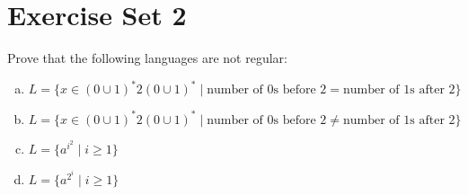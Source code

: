 \section{Exercise Set 2}\label{sec:exercise-set-2}
\begin{exercise}{1}
    Prove that the following languages are not regular:
    \begin{enumerate}[(a)]
        \item \(L=\{x\in{(0\cup1)}^*2{(0\cup1)}^* \mid \text{number of 0s before 2} = \text{number of 1s after 2}\} \)
        \item \(L=\{x\in{(0\cup1)}^*2{(0\cup1)}^* \mid \text{number of 0s before 2} \neq \text{number of 1s after 2}\} \)
        \item \(L=\{a^{i^2} \mid i\geq1\} \)
        \item \(L=\{a^{2^i} \mid i\geq1\} \)
    \end{enumerate}
\end{exercise}
